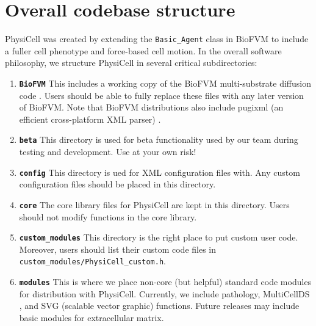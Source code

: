 \documentclass[12pt]{article}
\renewcommand{\v}{\verb}
\newcommand{\smallcode}[1]{\textbf{\texttt{#1}}}
\newcommand{\blue}[1]{\textcolor{blue}{#1}}
\newcommand{\DONE}{}%
\begin{document}
\section{Overall codebase structure \DONE}
PhysiCell was created by extending the \v|Basic_Agent| class in BioFVM \cite{ref:BioFVM} to include a fuller cell phenotype 
and force-based cell motion. In the overall software philosophy, we structure PhysiCell in several critical 
subdirectories: 
\begin{enumerate}
\item 
\smallcode{BioFVM} This includes a working copy of the BioFVM multi-substrate diffusion code \cite{ref:BioFVM}. Users should be able 
to fully replace these files with any later version of BioFVM. Note that BioFVM distributions also include 
pugixml (an efficient cross-platform XML parser) \cite{ref:pugixml}. 
\item 
\smallcode{beta} This directory is used for beta functionality used by our team during 
testing and development. Use at your own risk! 
\item 
\smallcode{config} This directory is ued for XML configuration files with. Any custom configuration files should be placed in this directory. 
\item 
\smallcode{core} The core library files for PhysiCell are kept in this directory. Users should not modify functions in 
the core library. 
\item 
\smallcode{custom\_modules} This directory is the right place to put custom user code. Moreover, users should 
list their custom code files in \v|custom_modules/PhysiCell_custom.h|. 

\item 
\smallcode{modules} This is where we place non-core (but helpful) standard code modules for distribution with PhysiCell. 
Currently, we include pathology, MultiCellDS \cite{ref:MultiCellDS}, and SVG (scalable vector graphic) functions. 
Future releases may include basic modules for extracellular matrix. 
\end{enumerate}
\end{document}
